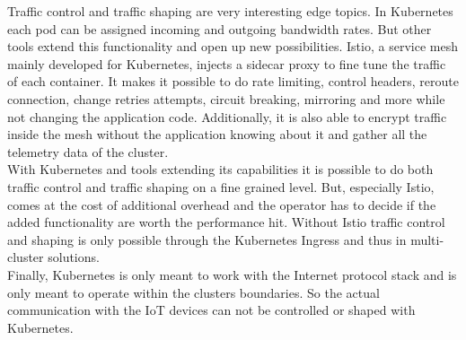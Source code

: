 Traffic control and traffic shaping are very interesting edge topics. In Kubernetes each pod can be assigned incoming and outgoing bandwidth rates. But other tools extend this functionality and open up new possibilities. Istio, a service mesh mainly developed for Kubernetes, injects a sidecar proxy to fine tune the traffic of each container. It makes it possible to do rate limiting, control headers, reroute connection, change retries attempts, circuit breaking, mirroring and more while not changing the application code. Additionally, it is also able to encrypt traffic inside the mesh without the application knowing about it and gather all the telemetry data of the cluster. \\
With Kubernetes and tools extending its capabilities it is possible to do both traffic control and traffic shaping on a fine grained level. But, especially Istio, comes at the cost of additional overhead and the operator has to decide if the added functionality are worth the performance hit. Without Istio traffic control and shaping is only possible through the Kubernetes Ingress and thus in multi-cluster solutions.\\
Finally, Kubernetes is only meant to work with the Internet protocol stack and is only meant to operate within the clusters boundaries. So the actual communication with the IoT devices can not be controlled or shaped with Kubernetes.\\[0.5mm] 